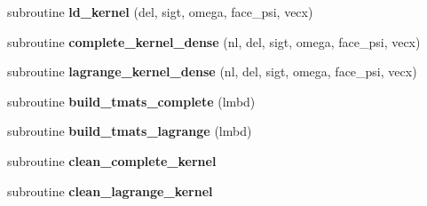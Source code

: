 \begin{DoxyCompactItemize}
\item 
\hypertarget{classdgfem__kernel__module_ab2895739fbca15c13bfc209f2a9f56c1}{subroutine {\bfseries ld\+\_\+kernel} (del, sigt, omega, face\+\_\+psi, vecx)}\label{classdgfem__kernel__module_ab2895739fbca15c13bfc209f2a9f56c1}

\item 
\hypertarget{classdgfem__kernel__module_ae9af8c276042e07c95df3223a2efba18}{subroutine {\bfseries complete\+\_\+kernel\+\_\+dense} (nl, del, sigt, omega, face\+\_\+psi, vecx)}\label{classdgfem__kernel__module_ae9af8c276042e07c95df3223a2efba18}

\item 
\hypertarget{classdgfem__kernel__module_a695419069631a5882cef0dd9320ef81b}{subroutine {\bfseries lagrange\+\_\+kernel\+\_\+dense} (nl, del, sigt, omega, face\+\_\+psi, vecx)}\label{classdgfem__kernel__module_a695419069631a5882cef0dd9320ef81b}

\item 
\hypertarget{classdgfem__kernel__module_ae8f2982412ffa7c942882499aee04ffd}{subroutine {\bfseries build\+\_\+tmats\+\_\+complete} (lmbd)}\label{classdgfem__kernel__module_ae8f2982412ffa7c942882499aee04ffd}

\item 
\hypertarget{classdgfem__kernel__module_a5c329bf38a7b02608a8bbc8daba555ca}{subroutine {\bfseries build\+\_\+tmats\+\_\+lagrange} (lmbd)}\label{classdgfem__kernel__module_a5c329bf38a7b02608a8bbc8daba555ca}

\item 
\hypertarget{classdgfem__kernel__module_a9dd092be0f5af7f7456a89a064dc8efe}{subroutine {\bfseries clean\+\_\+complete\+\_\+kernel}}\label{classdgfem__kernel__module_a9dd092be0f5af7f7456a89a064dc8efe}

\item 
\hypertarget{classdgfem__kernel__module_a4cc0ad331dffcc26358eeb4a99ab36ac}{subroutine {\bfseries clean\+\_\+lagrange\+\_\+kernel}}\label{classdgfem__kernel__module_a4cc0ad331dffcc26358eeb4a99ab36ac}

\end{DoxyCompactItemize}
